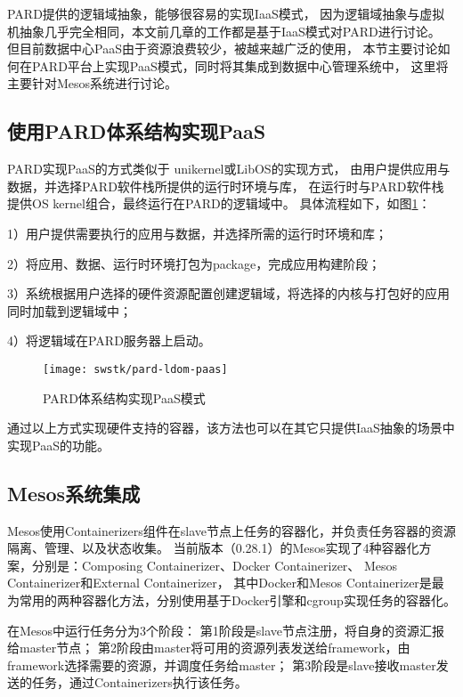 PARD提供的逻辑域抽象，能够很容易的实现IaaS模式，
因为逻辑域抽象与虚拟机抽象几乎完全相同，本文前几章的工作都是基于IaaS模式对PARD进行讨论。
但目前数据中心PaaS由于资源浪费较少，被越来越广泛的使用，
本节主要讨论如何在PARD平台上实现PaaS模式，同时将其集成到数据中心管理系统中，
这里将主要针对Mesos系统进行讨论。

\subsection{使用PARD体系结构实现PaaS}
PARD实现PaaS的方式类似于
unikernel\cite{Unikernels:2013}或LibOS\cite{Porter:2011}的实现方式，
由用户提供应用与数据，并选择PARD软件栈所提供的运行时环境与库，
在运行时与PARD软件栈提供OS kernel组合，最终运行在PARD的逻辑域中。
具体流程如下，如图\ref{fig:pard-ldom-paas}：

1）用户提供需要执行的应用与数据，并选择所需的运行时环境和库；

2）将应用、数据、运行时环境打包为package，完成应用构建阶段；

3）系统根据用户选择的硬件资源配置创建逻辑域，将选择的内核与打包好的应用同时加载到逻辑域中；

4）将逻辑域在PARD服务器上启动。

\begin{figure}[tb]
  \centering
  \texttt{[image: swstk/pard-ldom-paas]}
  \caption{PARD体系结构实现PaaS模式}
  \label{fig:pard-ldom-paas}
\end{figure}

通过以上方式实现硬件支持的容器，该方法也可以在其它只提供IaaS抽象的场景中实现PaaS的功能。

\subsection{Mesos系统集成}

Mesos使用Containerizers组件在slave节点上任务的容器化，并负责任务容器的资源隔离、管理、以及状态收集。
当前版本（0.28.1）的Mesos实现了4种容器化方案，分别是：Composing Containerizer、Docker Containerizer、
Mesos Containerizer和External Containerizer，
其中Docker和Mesos Containerizer是最为常用的两种容器化方法，分别使用基于Docker引擎和cgroup实现任务的容器化。

在Mesos中运行任务分为3个阶段：
第1阶段是slave节点注册，将自身的资源汇报给master节点；
第2阶段由master将可用的资源列表发送给framework，由framework选择需要的资源，并调度任务给master；
第3阶段是slave接收master发送的任务，通过Containerizers执行该任务。

